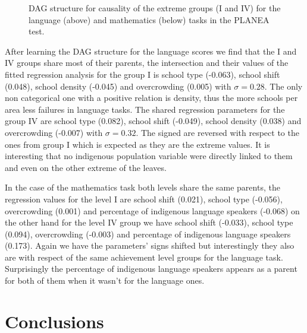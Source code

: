 \documentclass[9pt,twocolumn,twoside,]{pnas-new}
\begin{document}
\begin{figure*}
\quad
{}
\quad
{}
\quad
{}
\caption{DAG structure for causality of the extreme groups (I and IV) for the language (above) and mathematics (below) tasks in the PLANEA test.}
\label{fig:dags}
\end{figure*}

After learning the DAG structure for the language scores we find that
the I and IV groups share most of their parents, the intersection and
their values of the fitted regression analysis for the group I is school
type (-0.063), school shift (0.048), school density (-0.045) and
overcrowding (0.005) with \(\sigma=0.28\). The only non categorical one
with a positive relation is density, thus the more schools per area less
failures in language tasks. The shared regression parameters for the
group IV are school type (0.082), school shift (-0.049), school density
(0.038) and overcrowding (-0.007) with \(\sigma=0.32\). The signed are
reversed with respect to the ones from group I which is expected as they
are the extreme values. It is interesting that no indigenous population
variable were directly linked to them and even on the other extreme of
the leaves.

In the case of the mathematics task both levels share the same parents,
the regression values for the level I are school shift (0.021), school
type (-0.056), overcrowding (0.001) and percentage of indigenous
language speakers (-0.068) on the other hand for the level IV group we
have school shift (-0.033), school type (0.094), overcrowding (-0.003)
and percentage of indigenous language speakers (0.173). Again we have
the parameters' signs shifted but interestingly they also are with
respect of the same achievement level groups for the language task.
Surprisingly the percentage of indigenous language speakers appears as a
parent for both of them when it wasn't for the language ones.

\hypertarget{conclusions}{%
\section*{Conclusions}\label{conclusions}}
\end{document}
